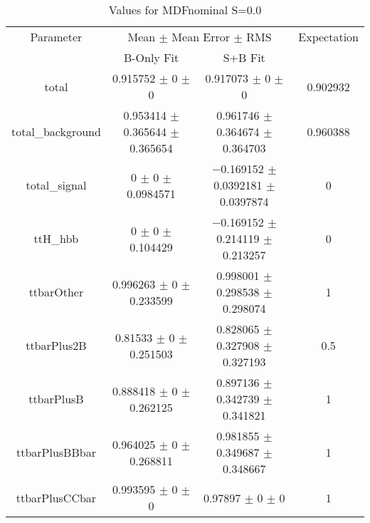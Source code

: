 \begin{table}
\centering
\caption{Values for MDFnominal S=0.0}
\begin{tabular}{cccc}
\toprule
Parameter & \multicolumn{2}{c}{Mean $\pm$ Mean Error $\pm$ RMS} & Expectation\\
 & B-Only Fit & S+B Fit & \\
\midrule
total & \num{0.915752} $\pm$ \num{0} $\pm$ \num{0} & \num{0.917073} $\pm$ \num{0} $\pm$ \num{0} & \num{0.902932}\\
total\_background & \num{0.953414} $\pm$ \num{0.365644} $\pm$ \num{0.365654} & \num{0.961746} $\pm$ \num{0.364674} $\pm$ \num{0.364703} & \num{0.960388}\\
total\_signal & \num{0} $\pm$ \num{0} $\pm$ \num{0.0984571} & \num{-0.169152} $\pm$ \num{0.0392181} $\pm$ \num{0.0397874} & \num{0}\\
ttH\_hbb & \num{0} $\pm$ \num{0} $\pm$ \num{0.104429} & \num{-0.169152} $\pm$ \num{0.214119} $\pm$ \num{0.213257} & \num{0}\\
ttbarOther & \num{0.996263} $\pm$ \num{0} $\pm$ \num{0.233599} & \num{0.998001} $\pm$ \num{0.298538} $\pm$ \num{0.298074} & \num{1}\\
ttbarPlus2B & \num{0.81533} $\pm$ \num{0} $\pm$ \num{0.251503} & \num{0.828065} $\pm$ \num{0.327908} $\pm$ \num{0.327193} & \num{0.5}\\
ttbarPlusB & \num{0.888418} $\pm$ \num{0} $\pm$ \num{0.262125} & \num{0.897136} $\pm$ \num{0.342739} $\pm$ \num{0.341821} & \num{1}\\
ttbarPlusBBbar & \num{0.964025} $\pm$ \num{0} $\pm$ \num{0.268811} & \num{0.981855} $\pm$ \num{0.349687} $\pm$ \num{0.348667} & \num{1}\\
ttbarPlusCCbar & \num{0.993595} $\pm$ \num{0} $\pm$ \num{0} & \num{0.97897} $\pm$ \num{0} $\pm$ \num{0} & \num{1}\\
\bottomrule
\end{tabular}
\end{table}